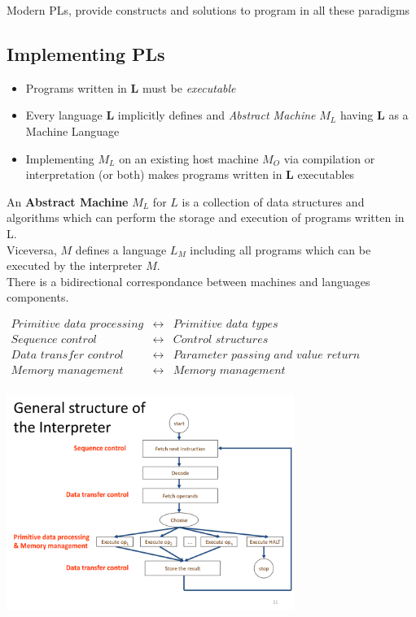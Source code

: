Modern PLs, provide constructs and solutions to program in all these paradigms

\subsection{Implementing PLs}
\begin{itemize}
    \item Programs written in \textbf{L} must be \textit{executable}
    \item Every language \textbf{L} implicitly defines and \textit{Abstract Machine} \textbf{$M_L$} having \textbf{L} as a Machine Language
    \item Implementing $M_L$ on an existing host machine $M_O$ via compilation or interpretation (or both) makes programs written in \textbf{L} executables 
\end{itemize}

An \textbf{Abstract Machine} $M_L$ for $L$ is a collection of data structures and algorithms which can perform the storage and execution of programs written in L.\\
Viceversa, $M$ defines a language $L_M$ including all programs which can be executed by the interpreter $M$.\\
There is a bidirectional correspondance between machines and languages components.\\
\begin{center}
$
\begin{array}{ccc}
    \textit{Primitive data processing} & \longleftrightarrow & \textit{Primitive data types}  \\
    \textit{Sequence control} & \longleftrightarrow & \textit{Control structures}  \\
    \textit{Data transfer control }& \longleftrightarrow & \textit{Parameter passing and value return}  \\
    \textit{Memory management }& \longleftrightarrow & \textit{Memory management}\\
     & 
\end{array}
$   
\end{center}

\begin{center}
\includegraphics[width=0.7\textwidth]{images/interpreter_structure.png}
\end{center}

